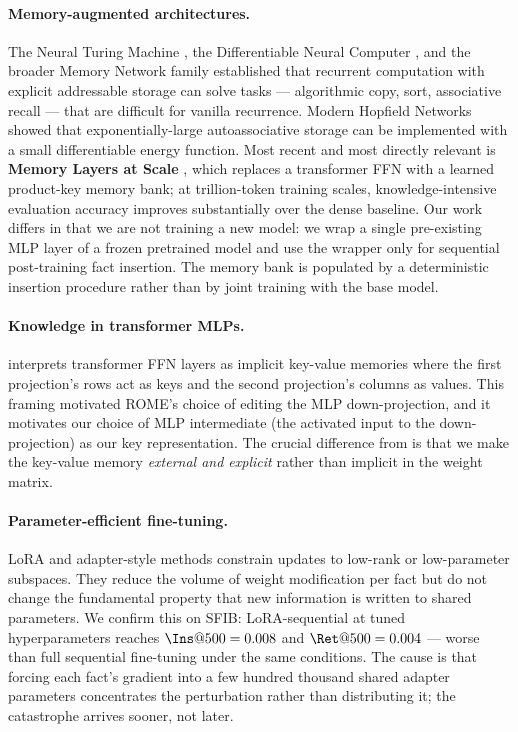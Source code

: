 \documentclass[11pt,a4paper]{article}
\begin{document}
\paragraph{Memory-augmented architectures.}
The Neural Turing Machine \citep{graves2014ntm}, the Differentiable Neural
Computer \citep{graves2016dnc}, and the broader Memory Network
\citep{weston2015memnets} family established that recurrent computation
with explicit addressable storage can solve tasks --- algorithmic copy,
sort, associative recall --- that are difficult for vanilla recurrence.
Modern Hopfield Networks \citep{ramsauer2020modern} showed that
exponentially-large autoassociative storage can be implemented with a
small differentiable energy function. Most recent and most directly
relevant is \textbf{Memory Layers at Scale} \citep{berges2024memory},
which replaces a transformer FFN with a learned product-key memory bank;
at trillion-token training scales, knowledge-intensive evaluation
accuracy improves substantially over the dense baseline. Our work
differs in that we are not training a new model: we wrap a single
pre-existing MLP layer of a frozen pretrained model and use the wrapper
only for sequential post-training fact insertion. The memory bank is
populated by a deterministic insertion procedure rather than by joint
training with the base model.

\paragraph{Knowledge in transformer MLPs.}
\citet{geva2021keyvalue} interprets transformer FFN layers as
implicit key-value memories where the first projection's rows act as
keys and the second projection's columns as values. This framing
motivated ROME's choice of editing the MLP down-projection, and it
motivates our choice of MLP intermediate (the activated input to the
down-projection) as our key representation. The crucial difference from
\citet{geva2021keyvalue} is that we make the key-value memory
\emph{external and explicit} rather than implicit in the weight matrix.

\paragraph{Parameter-efficient fine-tuning.}
LoRA \citep{hu2022lora} and adapter-style methods constrain updates to
low-rank or low-parameter subspaces. They reduce the volume of weight
modification per fact but do not change the fundamental property that
new information is written to shared parameters. We confirm this on SFIB:
LoRA-sequential at tuned hyperparameters reaches
$\Ins@500 = 0.008$ and $\Ret@500 = 0.004$ --- worse than full
sequential fine-tuning under the same conditions. The cause is that
forcing each fact's gradient into a few hundred thousand shared
adapter parameters concentrates the perturbation rather than
distributing it; the catastrophe arrives sooner, not later.
\end{document}

